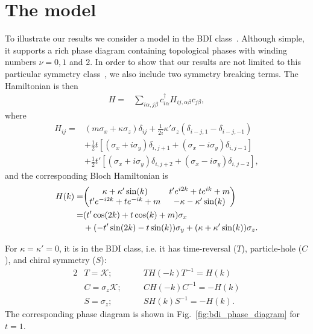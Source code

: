 \documentclass[twocolumn,amsmath,longbibliography,amssymb,superscriptaddress]{revtex4-1}
\begin{document}
\section{The model}
To illustrate our results we consider a model in the BDI class~\cite{Song2014}. Although simple, it supports a rich phase diagram containing topological phases with winding numbers $\nu =0,1$ and $2$. 
In order to show that our results are not limited to this particular symmetry class~\cite{ryu2010topological}, we also include two symmetry breaking terms. 
The Hamiltonian is then
\begin{align}
H =& \sum_{i\alpha,j\beta} c_{i\alpha}^\dagger H_{ij,\alpha \beta} c_{j\beta},
\end{align}
where 
\begin{align}
H_{ij} =& (m \sigma_x + \kappa \sigma_z)\delta_{ij}  + \frac{1}{2i}\kappa'\sigma_z (\delta_{i-j,1}-\delta_{i-j,-1})\nonumber\\
&+ \frac{1}{2} t \left[(\sigma_x + i \sigma_y)\delta_{i,j+1} + (\sigma_x - i \sigma_y) \delta_{i,j-1} \right] \nonumber\\
&+  \frac{1}{2} t' \left[(\sigma_x + i \sigma_y)\delta_{i,j+2} + (\sigma_x - i \sigma_y) \delta_{i,j-2} \right],
\label{bdi_model}
\end{align}
and the corresponding Bloch Hamiltonian is 
\begin{align}
H(k)=&\mqty( \kappa + \kappa' \sin(k) & t' e^{i2k} + t e^{ik}+m \nonumber\\t' e^{-i2k} + t e^{-ik}+m & -\kappa-\kappa' \sin(k)  )\nonumber \\
=& (t' \cos(2k)+t\cos(k)+m)\sigma_x \\
&+ (-t' \sin(2k)-t\sin(k))\sigma_y + (\kappa+\kappa'\sin(k)) \sigma_z.\nonumber
\end{align}

For $\kappa = \kappa' = 0$, it is in the BDI class, i.e. it has time-reversal ($T$), particle-hole ($C$), and chiral symmetry ($S$):
\begin{alignat}{2}
&T = \mathcal{K} ; \quad &&T H(-k) T^{-1} = H(k) \nonumber\\
&C = \sigma_z\mathcal{K} ; \quad &&C H(-k) C^{-1} = -H(k) \nonumber\\
&S = \sigma_z ; \quad &&S H(k)S^{-1} = -H(k) .
\end{alignat}
The corresponding phase diagram \cite{Song2014} is shown in Fig.~\ref{fig:bdi_phase_diagram} for $t=1$. 
\end{document}
